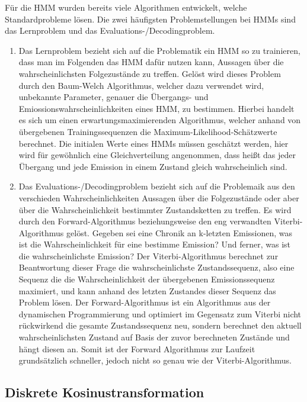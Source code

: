 Für die HMM wurden bereits viele Algorithmen entwickelt, welche Standardprobleme lösen.
 Die zwei häufigsten Problemstellungen bei HMMs sind das Lernproblem und das Evaluations-/Decodingproblem.

\begin{enumerate}
	\item Das Lernproblem bezieht sich auf die Problematik ein HMM so zu trainieren, dass man im Folgenden das HMM dafür nutzen kann, Aussagen über die wahrscheinlichsten Folgezustände zu treffen.
Gelöst wird dieses Problem durch den Baum-Welch Algorithmus, welcher dazu verwendet wird, unbekannte Parameter, genauer die Übergangs- und Emiossionswahrscheinlichkeiten eines HMM, zu bestimmen.
 Hierbei handelt es sich um einen erwartungsmaximierenden Algorithmus, welcher anhand von übergebenen Trainingssequenzen die Maximum-Likelihood-Schätzwerte berechnet.
 Die initialen Werte eines HMMs müssen geschätzt werden, hier wird für gewöhnlich eine Gleichverteilung angenommen, dass heißt das jeder Übergang und jede Emission in einem Zustand gleich wahrscheinlich sind.

	\item Das Evaluations-/Decodingproblem bezieht sich auf die Problemaik aus den verschieden Wahrscheinlichkeiten Aussagen über die Folgezustände oder aber über die Wahrscheinlichkeit bestimmter Zustandsketten zu treffen.
Es wird durch den Forward-Algorithmus beziehungsweise den eng verwandten Viterbi-Algorithmus gelöst.
 Gegeben sei eine Chronik an k-letzten Emissionen, was ist die Wahrscheinlichkeit für eine bestimme Emission? Und ferner, was ist die wahrscheinlichste Emission? Der Viterbi-Algorithmus berechnet zur Beantwortung dieser Frage die wahrscheinlichste Zustandssequenz, also eine Sequenz die die Wahrscheinlichkeit der übergebenen Emissionssequenz maximiert, und kann anhand des letzten Zustandes dieser Sequenz das Problem lösen.
 Der Forward-Algorithmus ist ein Algorithmus aus der dynamischen Programmierung und optimiert im Gegensatz zum Viterbi nicht rückwirkend die gesamte Zustandssequenz neu, sondern berechnet den aktuell wahrscheinlichsten Zustand auf Basis der zuvor berechneten Zustände und hängt diesen an.
 Somit ist der Forward Algorithmus zur Laufzeit grundsätzlich schneller, jedoch nicht so genau wie der Viterbi-Algorithmus.
 \end{enumerate}


\subsection{Diskrete Kosinustransformation}
\label{sec:dct}

